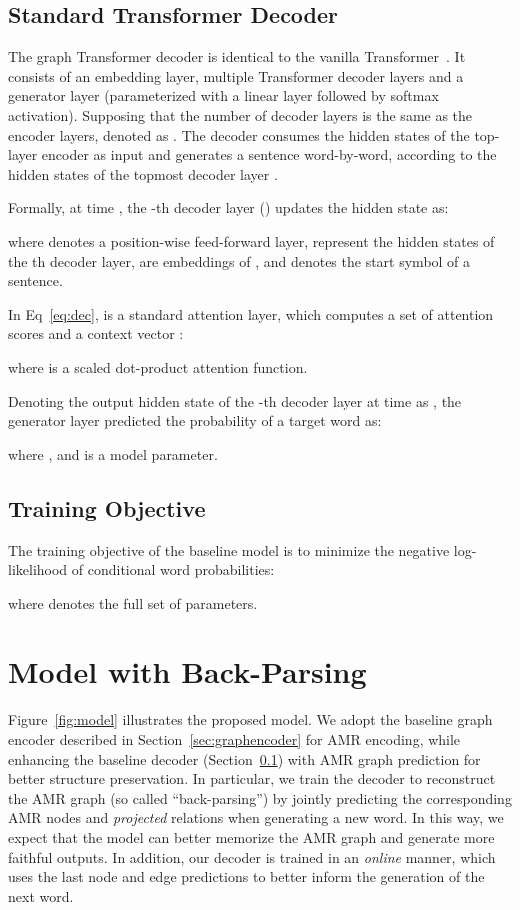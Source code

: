 \documentclass[11pt,a4paper]{article}
\begin{document}
\subsection{Standard Transformer Decoder}
\label{sec:stddecoder}
The graph Transformer decoder is identical to the vanilla Transformer~\cite{vaswani2017attention}.
It consists of an embedding layer, multiple Transformer decoder layers and a generator layer (parameterized with a linear layer followed by softmax activation). 
Supposing that the number of decoder layers is the same as the encoder layers, denoted as .
The decoder consumes the hidden states of the top-layer encoder  as input and generates a sentence  word-by-word, according to the hidden states of the topmost decoder layer .


Formally, at time , the -th decoder layer () updates the hidden state as:

where  denotes a position-wise feed-forward layer,  represent the hidden states of the th decoder layer,  are embeddings of , and  denotes the start symbol of a sentence.

In Eq~\ref{eq:dec},  is a standard attention layer, which computes a set of attention scores  and a context vector :

where  is a scaled dot-product attention function. 

Denoting the output hidden state of the -th decoder layer at time  as , the generator layer predicted the probability of a target word  as:

where , and  is a model parameter.

\subsection{Training Objective}
The training objective of the baseline model is to minimize the negative log-likelihood of conditional word probabilities:

where  denotes the full set of parameters.

\section{Model with Back-Parsing}
Figure~\ref{fig:model} illustrates the proposed model. 
We adopt the baseline graph encoder described in Section~\ref{sec:graphencoder} for AMR encoding,
while enhancing the baseline decoder (Section~\ref{sec:stddecoder}) with  AMR graph prediction for better structure preservation.
In particular, we train the decoder to reconstruct the AMR graph (so called ``back-parsing'') by jointly predicting the corresponding AMR nodes and {\it projected} relations when generating a new word. 
In this way, we expect that the model can better memorize the AMR graph and generate more faithful outputs.
In addition, our decoder is trained in an \textit{online} manner, which uses the last node and edge predictions to better inform the generation of the next word.
\end{document}

